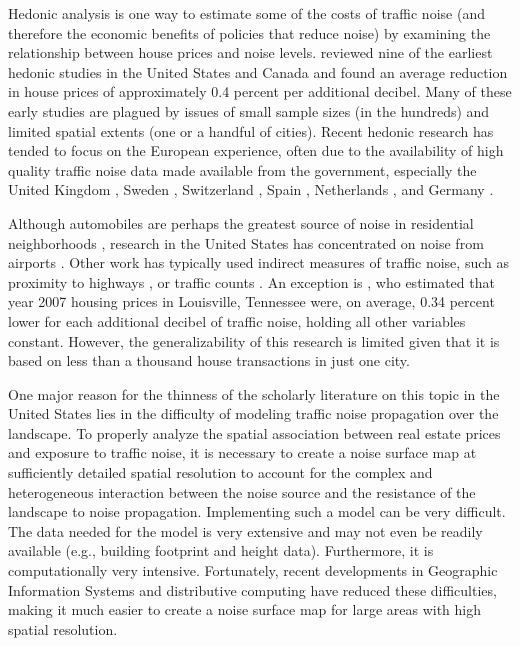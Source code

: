 \documentclass{article}\usepackage[]{graphicx}\usepackage[]{color}
\begin{document}
Hedonic analysis is one way to estimate some of the costs of traffic noise (and therefore the economic benefits of policies that reduce noise) by examining the relationship between house prices and noise levels. \citet{Nelson1982} reviewed nine of the earliest hedonic studies in the United States and Canada and found an average reduction in house prices of approximately 0.4 percent per additional decibel. Many of these early studies \citep[such as][]{Gamble1974, Langley1976} are plagued by issues of small sample sizes (in the hundreds) and limited spatial extents (one or a handful of cities). Recent hedonic research has tended to focus on the European experience, often due to the availability of high quality traffic noise data made available from the government, especially the United Kingdom \citep{Day2007, Blanco2011}, Sweden \citep{Wilhelmsson2000, Andersson2010}, Switzerland \citep{Baranzini2010}, Spain \citep{MarmolejoDuarteCarlos;GonzalezTamez2009}, Netherlands \citep{Theebe2004a}, and Germany \citep{Brandt2011}. 


Although automobiles are perhaps the greatest source of noise in residential neighborhoods \citep{Barber2010}, research in the United States has concentrated on noise from airports \citep{Espey2000, McMillen2004, Cohen2008a}. Other work has typically used indirect measures of traffic noise, such as proximity to highways \citep{Matthews2007, Chernobai2009, Li2012}, or traffic counts \citep{HughesJr.1992, Larsen2012}. An exception is \citet{Cheng2008}, who estimated that year 2007 housing prices in Louisville, Tennessee were, on average, 0.34 percent lower for each additional decibel of traffic noise, holding all other variables constant. However, the generalizability of this research is limited given that it is based on less than a thousand house transactions in just one city. 

One major reason for the thinness of the scholarly literature on this topic in the United States lies in the difficulty of modeling traffic noise propagation over the landscape. To properly analyze the spatial association between real estate prices and exposure to traffic noise, it is necessary to create a noise surface map at sufficiently detailed spatial resolution to account for the complex and heterogeneous interaction between the noise source and the resistance of the landscape to noise propagation.  Implementing such a model can be very difficult.  The data needed for the model is very extensive and may not even be readily available (e.g., building footprint and height data).  Furthermore, it is computationally very intensive. Fortunately, recent developments in Geographic Information Systems and distributive computing have reduced these difficulties, making it much easier to create a noise surface map for large areas with high spatial resolution.  
\end{document}
